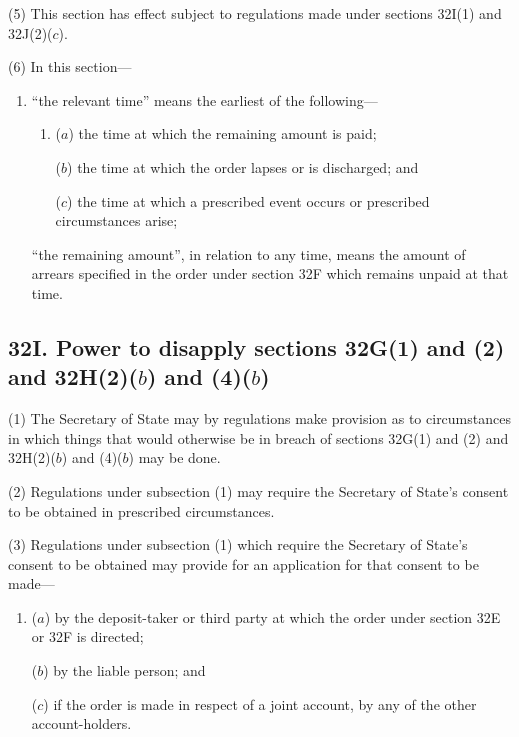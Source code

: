 \documentclass[12pt,a4paper]{article}
\begin{document}
(5) This section has effect subject to regulations made under sections 32I(1) and
32J(2)($c$).

(6) In this section---
\begin{enumerate}\item[]
“the relevant time” means the earliest of the following---
\begin{enumerate}\item[]
($a$) the time at which the remaining amount is paid;

($b$) the time at which the order lapses or is discharged; and

($c$) the time at which a prescribed event occurs or prescribed circumstances
arise;
\end{enumerate}

“the remaining amount”, in relation to any time, means the amount of arrears
specified in the order under section 32F which remains unpaid at that time.
\end{enumerate}


\subsection{\sloppy 32I. Power to disapply sections 32G(1) and (2) and 32H(2)($b$) and (4)($b$)}

(1) The Secretary of State may by regulations make provision as to
circumstances in which things that would otherwise be in breach of sections 32G(1) and (2) and 32H(2)($b$) and (4)($b$) may be done.

(2) Regulations under subsection (1) may require the Secretary of State’s consent
to be obtained in prescribed circumstances.

(3) Regulations under subsection (1) which require the Secretary of State’s consent
to be obtained may provide for an application for that consent to be made---
\begin{enumerate}\item[]
($a$) by the deposit-taker or third party at which the order under section 32E or
32F is directed;

($b$) by the liable person; and

($c$) if the order is made in respect of a joint account, by any of the other account-holders.
\end{enumerate}
\end{document}
